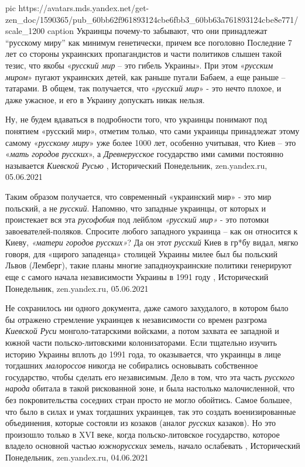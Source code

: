 \ifcmt
  pic https://avatars.mds.yandex.net/get-zen_doc/1590365/pub_60bb62f961893124cbe6fbb3_60bb63a761893124cbe8e771/scale_1200
  caption Украинцы почему-то забывают, что они принадлежат \enquote{русскому миру} как минимум генетически, причем все поголовно
\fi
Последние 7 лет со стороны украинских пропагандистов и части политиков слышен
такой тезис, что якобы «\emph{русский мир} – это гибель Украины». При этом
«\emph{русским миром}» пугают украинских детей, как раньше пугали Бабаем, а еще раньше
– татарами. В общем, так получается, что «\emph{русский мир}» - это нечто
плохое, и даже ужасное, и его в Украину допускать никак нельзя.

Ну, не будем вдаваться в подробности того, что украинцы понимают под понятием
«русский мир», отметим только, что сами украинцы принадлежат этому самому
«\emph{русскому миру}» уже более 1000 лет, особенно учитывая, что Киев – это
«\emph{мать городов русских}», а \emph{Древнерусское} государство ими самими
постоянно называется \emph{Киевской Русью}
, 
Исторический Понедельник, zen.yandex.ru, 05.06.2021 

Таким образом получается, что современный «украинский мир» - это мир польский,
а не \emph{русский}. Напомню, что западные украинцы, от которых и проистекает
вся эта \emph{русофобия} под лейблом \emph{«русский мир»} - это потомки
завоевателей-поляков. Спросите любого западного украинца – как он относится к
Киеву, \emph{«матери городов русских»}? Да он этот \emph{русский} Киев в гр*бу
видал, мягко говоря, для «щирого западенца» столицей Украины милее был бы
польский Львов (Лемберг), такие планы многие западноукраинские политики
генерируют еще с самого начала независимости Украины в 1991 году
, 
Исторический Понедельник, zen.yandex.ru, 05.06.2021 

Не сохранилось ни одного документа, даже самого захудалого, в котором было бы
отражено стремление украинцев к независимости со времен разгрома \emph{Киевской Руси}
монголо-татарскими войсками, а потом захвата ее западной и южной части
польско-литовскими колонизаторами. Если тщательно изучить историю Украины
вплоть до 1991 года, то оказывается, что украинцы в лице тогдашних \emph{малороссов}
никогда не собирались основывать собственное государство, чтобы сделать его
независимым.  Дело в том, что эта часть \emph{русского народа} обитала в такой
рискованной зоне, и была настолько малочисленной, что без покровительства
соседних стран просто не могло обойтись. Самое большее, что было в силах и умах
тогдашних украинцев, так это создать военизированные объединения, которые
состояли из козаков (аналог \emph{русских} казаков). Но это произошло только в XVI
веке, когда польско-литовское государство, которое владело основной частью
\emph{южнорусских} земель, начало ослабевать
, 
Исторический Понедельник, zen.yandex.ru, 04.06.2021

